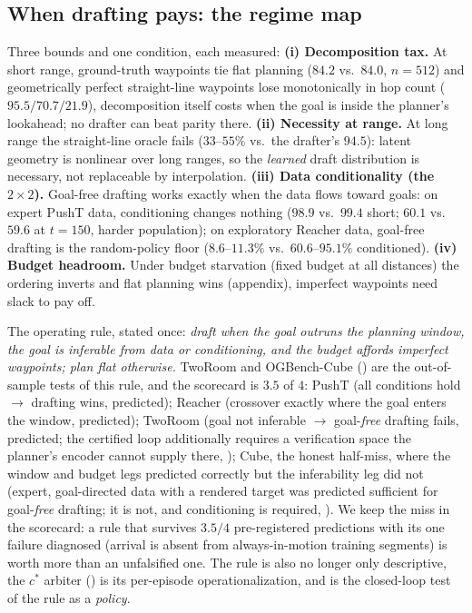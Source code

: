\documentclass{article}
\begin{document}
\subsection{When drafting pays: the regime map}
\label{sec:why-regime}
Three bounds and one condition, each measured:
\textbf{(i) Decomposition tax.} At short range, ground-truth waypoints tie flat
planning ($84.2$ vs.\ $84.0$, $n{=}512$) and geometrically perfect straight-line
waypoints lose monotonically in hop count ($95.5/70.7/21.9$), decomposition itself
costs when the goal is inside the planner's lookahead; no drafter can beat parity
there.
\textbf{(ii) Necessity at range.} At long range the straight-line oracle fails
($33$--$55\%$ vs.\ the drafter's $94.5$): latent geometry is nonlinear over long
ranges, so the \emph{learned} draft distribution is necessary, not replaceable by
interpolation.
\textbf{(iii) Data conditionality (the $2{\times}2$).} Goal-free drafting works
exactly when the data flows toward goals: on expert PushT data, conditioning changes
nothing ($98.9$ vs.\ $99.4$ short; $60.1$ vs.\ $59.6$ at $t{=}150$, harder
population); on exploratory Reacher data, goal-free drafting is the random-policy
floor ($8.6$--$11.3\%$ vs.\ $60.6$--$95.1\%$ conditioned).
\textbf{(iv) Budget headroom.} Under budget starvation (fixed budget at all
distances) the ordering inverts and flat planning wins (appendix), imperfect
waypoints need slack to pay off.

The operating rule, stated once: \emph{draft when the goal outruns the planning
window, the goal is inferable from data or conditioning, and the budget affords
imperfect waypoints; plan flat otherwise.} TwoRoom and OGBench-Cube
() are the out-of-sample tests of this rule, and the
scorecard is $3.5$ of $4$: PushT (all conditions hold $\to$ drafting wins,
predicted); Reacher (crossover exactly where the goal enters the window, predicted);
TwoRoom (goal not inferable $\to$ goal-\emph{free} drafting fails, predicted;
the certified loop additionally requires a verification space the planner's
encoder cannot supply there, ); Cube, the honest
half-miss, where the window and budget legs predicted correctly but the
inferability leg did not (expert, goal-directed data with a rendered target was
predicted sufficient for goal-\emph{free} drafting; it is not, and conditioning is
required, ). We keep the miss in the scorecard: a rule that
survives $3.5/4$ pre-registered predictions with its one failure diagnosed
(arrival is absent from always-in-motion training segments) is worth more than an
unfalsified one. The rule is also no longer only descriptive, the $c^{*}$
arbiter () is its per-episode operationalization, and
 is the closed-loop test of the rule as a \emph{policy}.
\end{document}
